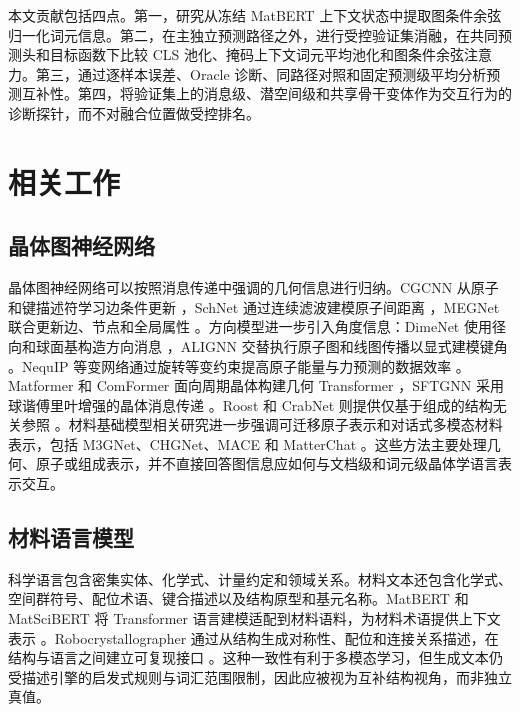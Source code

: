 \documentclass[a4paper,fleqn]{cas-sc}
\begin{document}
本文贡献包括四点。第一，研究从冻结 MatBERT 上下文状态中提取图条件余弦归一化词元信息。第二，在主独立预测路径之外，进行受控验证集消融，在共同预测头和目标函数下比较 CLS 池化、掩码上下文词元平均池化和图条件余弦注意力。第三，通过逐样本误差、Oracle 诊断、同路径对照和固定预测级平均分析预测互补性。第四，将验证集上的消息级、潜空间级和共享骨干变体作为交互行为的诊断探针，而不对融合位置做受控排名。

\section{相关工作}
\subsection{晶体图神经网络}
晶体图神经网络可以按照消息传递中强调的几何信息进行归纳。CGCNN 从原子和键描述符学习边条件更新 \citep{xie2018cgcnn}，SchNet 通过连续滤波建模原子间距离 \citep{schutt2018schnet}，MEGNet 联合更新边、节点和全局属性 \citep{chen2019megnet}。方向模型进一步引入角度信息：DimeNet 使用径向和球面基构造方向消息 \citep{gasteiger2020dimenet}，ALIGNN 交替执行原子图和线图传播以显式建模键角 \citep{choudhary2021alignn}。NequIP 等变网络通过旋转等变约束提高原子能量与力预测的数据效率 \citep{batzner2022nequip}。Matformer 和 ComFormer 面向周期晶体构建几何 Transformer \citep{yan2022matformer,yan2024comformer}，SFTGNN 采用球谐傅里叶增强的晶体消息传递 \citep{jiang2025sftgnn}。Roost 和 CrabNet 则提供仅基于组成的结构无关参照 \citep{goodall2020roost,wang2021crabnet}。材料基础模型相关研究进一步强调可迁移原子表示和对话式多模态材料表示，包括 M3GNet、CHGNet、MACE 和 MatterChat \citep{chen2022m3gnet,deng2023chgnet,batatia2023mace,tang2025matterchat}。这些方法主要处理几何、原子或组成表示，并不直接回答图信息应如何与文档级和词元级晶体学语言表示交互。

\subsection{材料语言模型}
科学语言包含密集实体、化学式、计量约定和领域关系。材料文本还包含化学式、空间群符号、配位术语、键合描述以及结构原型和基元名称。MatBERT 和 MatSciBERT 将 Transformer 语言建模适配到材料语料，为材料术语提供上下文表示 \citep{walker2021matbert,gupta2022matscibert}。Robocrystallographer 通过从结构生成对称性、配位和连接关系描述，在结构与语言之间建立可复现接口 \citep{ganose2019robocrystallographer}。这种一致性有利于多模态学习，但生成文本仍受描述引擎的启发式规则与词汇范围限制，因此应被视为互补结构视角，而非独立真值。
\end{document}
